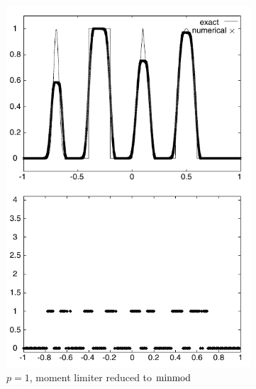 \begin{figure}[h]
  \centering
  \begin{subfigure}[t]{0.48\columnwidth}
    \centering
    \includegraphics[width=\textwidth]{figures/moment-p-1}
    \caption{$p = 1$, moment limiter reduced to $\operatorname{minmod}$}
    \label{fig:results-advection-p1}
  \end{subfigure}
  \hfill
  \begin{subfigure}[t]{0.48\columnwidth}
    \centering

\end{subfigure}
\end{figure}
